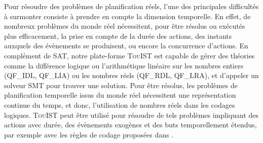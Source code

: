 \documentclass{jfpda2014}
\newcommand{\nameTool}{\textsc{TouIST}\xspace}
\begin{document}
Pour résoudre des problèmes de planification réels, l'une des principales difficultés à surmonter consiste à prendre en compte la dimension temporelle. En effet, de nombreux problèmes du monde réel nécessitent, pour être résolus ou exécutés plus efficacement, la prise en compte de la durée des actions, des instants auxquels des évènements se produisent, ou encore la concurrence d'actions.
En complément de SAT, notre plate-forme \nameTool est capable de gérer des théories comme la différence logique ou l'arithmétique linéaire sur les nombres entiers (QF\_IDL, QF\_LIA) ou les nombres réels (QF\_RDL, QF\_LRA), et d'appeler un solveur SMT pour trouver une solution. Pour être résolus, les problèmes de planification temporelle issus du monde réel nécessitent une représentation continue du temps, et donc, l'utilisation de nombres réels dans les codages logiques. \nameTool peut être utilisé pour résoudre de tels problèmes impliquant des actions avec durée, des évènements exogènes et des buts temporellement étendus, par exemple avec les règles de codage proposées dans \citep{MarisRegnier08}.









%
%



%
%






\end{document}
